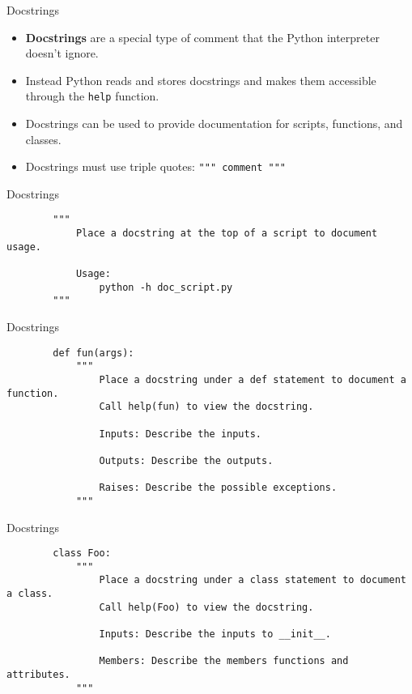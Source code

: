 \documentclass[serif,xcolor=pdftex,dvipsnames,table,hyperref={bookmarks=false,breaklinks}]{beamer}
\begin{document}
\begin{frame}[t,fragile]{Docstrings}
	\begin{itemize}[<+->]
		\item \textbf{Docstrings} are a special type of comment that the Python interpreter doesn't ignore.
		\item Instead Python reads and stores docstrings and makes them accessible through the \verb|help| function.
		\item Docstrings can be used to provide documentation for scripts, functions, and classes.
		\item Docstrings must use triple quotes: \verb|""" comment """|
	\end{itemize}

\end{frame}

\begin{frame}[t,fragile]{Docstrings}
	\begin{lstlisting}
		"""
		    Place a docstring at the top of a script to document usage.
			
		    Usage:
		        python -h doc_script.py
		"""
	\end{lstlisting}
\end{frame}

\begin{frame}[t,fragile]{Docstrings}
	\begin{lstlisting}
		def fun(args):
			"""
			    Place a docstring under a def statement to document a function.
			    Call help(fun) to view the docstring.
				
			    Inputs: Describe the inputs.
					
			    Outputs: Describe the outputs.
					
			    Raises: Describe the possible exceptions.
			"""
	\end{lstlisting}
\end{frame}

\begin{frame}[t,fragile]{Docstrings}
	\begin{lstlisting}
		class Foo:
			"""
			    Place a docstring under a class statement to document a class.
			    Call help(Foo) to view the docstring.
				
			    Inputs: Describe the inputs to __init__.
				
			    Members: Describe the members functions and attributes.
			"""
	\end{lstlisting}
\end{frame}
\end{document}
